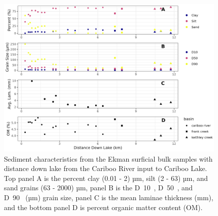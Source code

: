 \documentclass[Royal,times,doublespace,sageh]{sagej}
\begin{document}
\begin{figure}

{\centering \includegraphics[width=1\linewidth]{figs/ekman_seds} 

}

\caption{Sediment characteristics from the Ekman surficial bulk samples with distance down lake from the Cariboo River input to Cariboo Lake. Top panel A is the percent clay (0.01 - 2) µm, silt (2 - 63) µm, and sand grains (63 - 2000) µm, panel B is the  D~10~, D~50~, and D~90~ (µm) grain size, panel C is the mean laminae thickness (mm), and the bottom panel D is percent organic matter content (OM).}\label{fig:ekmanSeds}
\end{figure}
\end{document}
